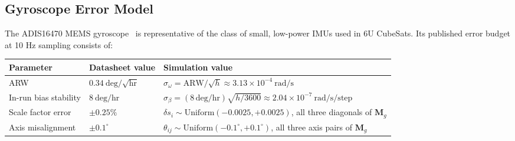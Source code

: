 \subsection{Gyroscope Error Model}
\label{sec:gyro_model}

The ADIS16470 MEMS gyroscope~\cite{ADIS16470} is representative of the class of
small, low-power IMUs used in 6U CubeSats.  Its published error budget at 10 Hz
sampling consists of:

\begin{center}
\begin{tabularx}{\textwidth}{l X X}
\hline
\textbf{Parameter} & \textbf{Datasheet value} & \textbf{Simulation value} \\
\hline\hline
ARW  & $0.34\ \mathrm{deg}/\!\sqrt{\mathrm{hr}}$ & $\sigma_\omega = \mathrm{ARW}/\sqrt{h} \approx 3.13\times10^{-4}\ \mathrm{rad/s}$ \\
\hline
In-run bias stability & $8\ \mathrm{deg/hr}$ & $\sigma_\beta = (8\,\mathrm{deg/hr})\sqrt{h/3600} \approx 2.04\times10^{-7}\ \mathrm{rad/s/step}$ \\
\hline
Scale factor error & $\pm 0.25\%$ & $\delta s_i \sim \mathrm{Uniform}(-0.0025,+0.0025)$, all three diagonals of $\mathbf{M}_g$ \\
\hline
Axis misalignment & $\pm 0.1^\circ$ & $\theta_{ij} \sim \mathrm{Uniform}(-0.1^\circ,+0.1^\circ)$, all three axis pairs of $\mathbf{M}_g$ \\
\hline
\end{tabularx}
\end{center}



